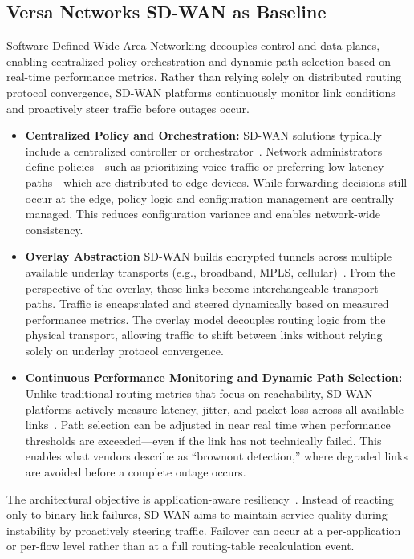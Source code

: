 \documentclass[conference]{IEEEtran}
\begin{document}
\subsection{Versa Networks SD-WAN as Baseline}

Software-Defined Wide Area Networking decouples control and data planes, enabling centralized policy orchestration and dynamic path selection based on real-time performance metrics. Rather than relying solely on distributed routing protocol convergence, SD-WAN platforms continuously monitor link conditions and proactively steer traffic before outages occur.



\begin{itemize}
    \item \textbf{Centralized Policy and Orchestration:} SD-WAN solutions typically include a centralized controller or orchestrator~\cite{cisco_sdwanoverview}. Network administrators define policies—such as prioritizing voice traffic or preferring low-latency paths—which are distributed to edge devices. While forwarding decisions still occur at the edge, policy logic and configuration management are centrally managed. This reduces configuration variance and enables network-wide consistency.

    \item \textbf{Overlay Abstraction} SD-WAN builds encrypted tunnels across multiple available underlay transports (e.g., broadband, MPLS, cellular)~\cite{fortinet_securesdwan}. From the perspective of the overlay, these links become interchangeable transport paths. Traffic is encapsulated and steered dynamically based on measured performance metrics. The overlay model decouples routing logic from the physical transport, allowing traffic to shift between links without relying solely on underlay protocol convergence.

    \item \textbf{Continuous Performance Monitoring and Dynamic Path Selection:} Unlike traditional routing metrics that focus on reachability, SD-WAN platforms actively measure latency, jitter, and packet loss across all available links~\cite{fortinet_securesdwan}. Path selection can be adjusted in near real time when performance thresholds are exceeded—even if the link has not technically failed. This enables what vendors describe as “brownout detection,” where degraded links are avoided before a complete outage occurs.
\end{itemize}

The architectural objective is application-aware resiliency~\cite{gartner_sdwanguide}. Instead of reacting only to binary link failures, SD-WAN aims to maintain service quality during instability by proactively steering traffic. Failover can occur at a per-application or per-flow level rather than at a full routing-table recalculation event.
\end{document}
